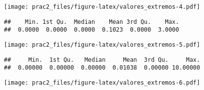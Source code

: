 \documentclass[]{article}
\newenvironment{Shaded}{\begin{snugshade}}{\end{snugshade}}
\newcommand{\DataTypeTok}[1]{\textcolor[rgb]{0.13,0.29,0.53}{#1}}
\newcommand{\KeywordTok}[1]{\textcolor[rgb]{0.13,0.29,0.53}{\textbf{#1}}}
\newcommand{\NormalTok}[1]{#1}
\newcommand{\OperatorTok}[1]{\textcolor[rgb]{0.81,0.36,0.00}{\textbf{#1}}}
\newcommand{\StringTok}[1]{\textcolor[rgb]{0.31,0.60,0.02}{#1}}
\begin{document}
\texttt{[image: prac2\_files/figure-latex/valores\_extremos-4.pdf]}

\begin{Shaded}
\end{Shaded}

\begin{verbatim}
##    Min. 1st Qu.  Median    Mean 3rd Qu.    Max. 
##  0.0000  0.0000  0.0000  0.1023  0.0000  3.0000
\end{verbatim}

\begin{Shaded}
\end{Shaded}

\texttt{[image: prac2\_files/figure-latex/valores\_extremos-5.pdf]}

\begin{Shaded}
\end{Shaded}

\begin{verbatim}
##     Min.  1st Qu.   Median     Mean  3rd Qu.     Max. 
##  0.00000  0.00000  0.00000  0.01038  0.00000 10.00000
\end{verbatim}

\begin{Shaded}
\end{Shaded}

\texttt{[image: prac2\_files/figure-latex/valores\_extremos-6.pdf]}

\begin{Shaded}
\end{Shaded}
\end{document}
